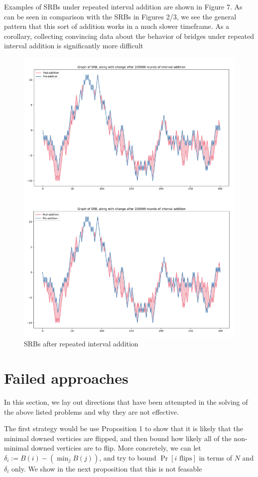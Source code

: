 \documentclass{article}
\theoremstyle{definition}
\begin{document}
Examples of SRBs under repeated interval addition are shown in Figure 7. As can be seen in comparison with the SRBs in Figures 2/3, we see the general pattern that this sort of addition works in a much slower timeframe. As a corollary, collecting convincing data about the behavior of bridges under repeated interval addition is significantly more difficult

\begin{figure}[h!]
\caption{SRBs after repeated interval addition}
\centering
\includegraphics[width=.7\textwidth]{Figure_7}
\end{figure}

\section{Failed approaches}

In this section, we lay out directions that have been attempted in the solving of the above listed problems and why they are not effective.

The first strategy would be use Proposition 1 to show that it is likely that the minimal downed verticies are flipped, and then bound how likely all of the non-minimal downed verticies are to flip. More concretely, we can let $\delta_i:=B(i)-(\min_jB(j))$, and try to bound $\Pr[i \,\,\mathrm{flips}]$ in terms of $N$ and $\delta_i$ only. We show in the next proposition that this is not feasable
\end{document}
